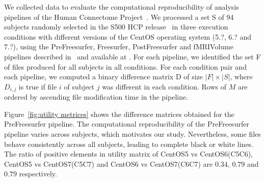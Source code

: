 \documentclass[10pt, conference, compsocconf]{IEEEtran}
\newcommand{\todo}[1]{\marginpar{\parbox{18mm}{\flushleft\tiny\color{red}\textbf{TODO}:
      #1}}}
\begin{document}
We collected data to evaluate the computational reproducibility of analysis
pipelines of the Human Connectome Project~\cite{general-hcp}. We
processed a set S of 94 subjects randomly selected in the S500 HCP
release~\todo{URL} in three execution conditions with different
versions of the CentOS operating system (5.?, 6.? and 7.?), using the
PreFreesurfer, Freesurfer, PostFreesurfer and fMRIVolume pipelines
described in~\cite{hcp-pipelines} and available at \todo{URL}. For
each pipeline, we identified the set F of files produced for all
subjects in all conditions. For each condition pair and each pipeline,
we computed a binary difference matrix D of size $|F|\times|S|$, where $D_{i,j}$ is true
if file $i$ of subject $j$ was different in each condition. Rows of
$M$ are ordered by ascending file modification time in the pipeline.

Figure~\ref{fig:utility metrices} shows the difference matrices
obtained for the PreFreesurfer pipeline. The computational
reproducibility of the PreFreesurfer pipeline varies across subjects,
which motivates our study. Nevertheless, some files behave
consistently across all subjects, leading to complete black or white
lines. The ratio of positive elements in utility matrix of CentOS5 vs CentOS6(C5C6),  CentOS5 vs CentOS7(C5C7) and  CentOS6 vs CentOS7(C6C7) are
$0.34$, $0.79$ and $0.79$ respectively.
\end{document}
